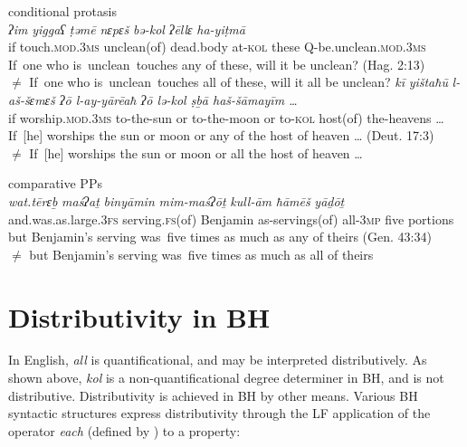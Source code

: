 \documentclass[output=paper]{langsci/langscibook}
\begin{document}
\ea%
    conditional protasis\label{ex:doron:43}\\
    \ea
    \gll \textit{ʔim}    \textit{yiggaʕ}                 \textit{ṭəmē}             \textit{nɛpɛš}          \textit{bə-kol}   \textit{ʔēllɛ}  \textit{ha-yiṭmā}\\
         if       touch.\textsc{mod.3ms}   unclean(of)  dead.body  at-\textsc{kol} these  Q-be.unclean\textsc{.mod.3ms}   \\
    \glt If~one who is~unclean~touches any of these, will it be unclean?  (Hag. 2:13)\\${\neq}$   If~one who is~unclean~touches all of these, will it all be unclean?
    \ex
    \gll \textit{kī} \textit{yištaħū}                    \textit{l-aš{}-šɛmɛš  ʔō  l-ay-yārēaħ  ʔō   lə-kol   ṣḇā         haš{}-šāmayīm  …}\\
         if  worship.\textsc{mod.3ms}  to-the-sun  or  to-the-moon  or  to-\textsc{kol} host(of) the-heavens  \textsc{…} \\
    \glt If~[he] worships the sun or moon or any of the host of heaven … (Deut. 17:3)\\${\neq}$   If~[he] worships the sun or moon or all the host of heaven …
    \z
\z

\ea%
comparative PPs\label{ex:doron:44}\\
\gll  \textit{wat.tērɛḇ}                     \textit{ma}\textit{ś}\textit{ʔaṯ}           \textit{binyāmin}   \textit{mim-ma}\textit{ś}\textit{ʔōṯ}      \textit{kull-ām} \textit{ħāmēš} \textit{yāḏōṯ}\\
and.was.as.large.3\textsc{fs}  serving.\textsc{fs}(of) Benjamin  as-servings(of) all-\textsc{3mp}  five     portions\\
\glt   but Benjamin’s serving was~five times as much as any of theirs (Gen. 43:34)\\${\neq}$ but Benjamin’s serving was~five times as much as all of theirs
\z

\section{Distributivity in BH}\label{sec:doron:4}%

In English, \textit{all} is quantificational, and may be interpreted distributively.  \linebreak As shown above, \textit{kol} is a non-quantificational degree determiner in BH, and is not distributive. Distributivity is achieved in BH by other means. Various BH syntactic structures express distributivity through the LF application of the operator \textit{each} (defined by \citealt{Link1987}) to a property:
\end{document}
